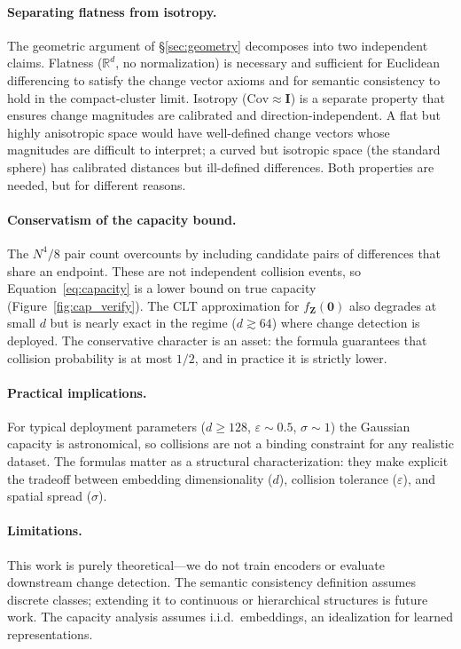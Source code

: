 \documentclass{article}
\newcommand{\vect}[1]{\mathbf{#1}}
\newcommand{\mat}[1]{\mathbf{#1}}
\newcommand{\R}{\mathbb{R}}
\newcommand\figref{Figure~\ref}
\renewcommand\eqref{Equation~\ref}
\newcommand*{\secref}[1]{\hyperref[{#1}]{\S\ref*{#1}}}
\begin{document}
\paragraph{Separating flatness from isotropy.} The geometric argument of \secref{sec:geometry} decomposes into two independent claims. Flatness ($\R^d$, no normalization) is necessary and sufficient for Euclidean differencing to satisfy the change vector axioms and for semantic consistency to hold in the compact-cluster limit. Isotropy ($\mathrm{Cov} \approx \mat{I}$) is a separate property that ensures change magnitudes are calibrated and direction-independent. A flat but highly anisotropic space would have well-defined change vectors whose magnitudes are difficult to interpret; a curved but isotropic space (the standard sphere) has calibrated distances but ill-defined differences. Both properties are needed, but for different reasons.

\paragraph{Conservatism of the capacity bound.} The $N^4/8$ pair count overcounts by including candidate pairs of differences that share an endpoint. These are not independent collision events, so \eqref{eq:capacity} is a lower bound on true capacity (\figref{fig:cap_verify}). The CLT approximation for $f_{\vect{Z}}(\vect{0})$ also degrades at small $d$ but is nearly exact in the regime ($d \gtrsim 64$) where change detection is deployed. The conservative character is an asset: the formula guarantees that collision probability is at most $1/2$, and in practice it is strictly lower.

\paragraph{Practical implications.} For typical deployment parameters ($d \ge 128$, $\varepsilon \sim 0.5$, $\sigma \sim 1$) the Gaussian capacity is astronomical, so collisions are not a binding constraint for any realistic dataset. The formulas matter as a structural characterization: they make explicit the tradeoff between embedding dimensionality ($d$), collision tolerance ($\varepsilon$), and spatial spread ($\sigma$).

\paragraph{Limitations.} This work is purely theoretical---we do not train encoders or evaluate downstream change detection. The semantic consistency definition assumes discrete classes; extending it to continuous or hierarchical structures is future work. The capacity analysis assumes i.i.d.\ embeddings, an idealization for learned representations.
\end{document}
